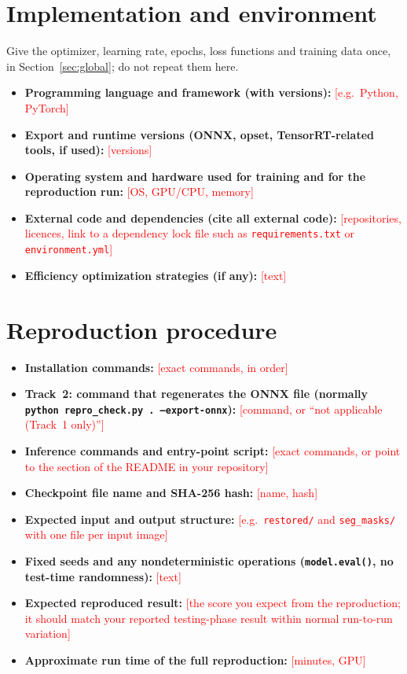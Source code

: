 \documentclass{article}
\newcommand{\todo}[1]{\textcolor{red}{[#1]}}
\begin{document}
\section{Implementation and environment}
Give the optimizer, learning rate, epochs, loss functions and training data once, in Section~\ref{sec:global}; do not repeat them here.
\begin{itemize}
\item \textbf{Programming language and framework (with versions):} \todo{e.g.\ Python, PyTorch}
\item \textbf{Export and runtime versions (ONNX, opset, TensorRT-related tools, if used):} \todo{versions}
\item \textbf{Operating system and hardware used for training and for the reproduction run:} \todo{OS, GPU/CPU, memory}
\item \textbf{External code and dependencies (cite all external code):} \todo{repositories, licences, link to a dependency lock file such as \texttt{requirements.txt} or \texttt{environment.yml}}
\item \textbf{Efficiency optimization strategies (if any):} \todo{text}
\end{itemize}

\section{Reproduction procedure}\label{sec:repro}
\begin{itemize}
\item \textbf{Installation commands:} \todo{exact commands, in order}
\item \textbf{Track~2: command that regenerates the ONNX file (normally \texttt{python repro\_check.py . --export-onnx}):} \todo{command, or ``not applicable (Track~1 only)''}
\item \textbf{Inference commands and entry-point script:} \todo{exact commands, or point to the section of the README in your repository}
\item \textbf{Checkpoint file name and SHA-256 hash:} \todo{name, hash}
\item \textbf{Expected input and output structure:} \todo{e.g.\ \texttt{restored/} and \texttt{seg\_masks/} with one file per input image}
\item \textbf{Fixed seeds and any nondeterministic operations (\texttt{model.eval()}, no test-time randomness):} \todo{text}
\item \textbf{Expected reproduced result:} \todo{the score you expect from the reproduction; it should match your reported testing-phase result within normal run-to-run variation}
\item \textbf{Approximate run time of the full reproduction:} \todo{minutes, GPU}
\end{itemize}
\end{document}
